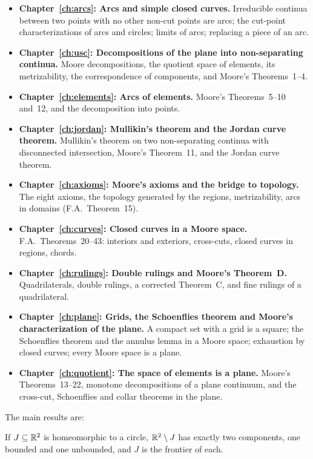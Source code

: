 \begin{itemize}
\item \textbf{Chapter~\ref{ch:arcs}: Arcs and simple closed curves.} Irreducible continua between two
points with no other non-cut points are arcs; the cut-point characterizations of arcs and circles;
limits of arcs; replacing a piece of an arc.
\item \textbf{Chapter~\ref{ch:usc}: Decompositions of the plane into non-separating continua.} Moore
decompositions, the quotient space of elements, its metrizability, the correspondence of components,
and Moore's Theorems~1--4.
\item \textbf{Chapter~\ref{ch:elements}: Arcs of elements.} Moore's Theorems~5--10 and~12, and the
decomposition into points.
\item \textbf{Chapter~\ref{ch:jordan}: Mullikin's theorem and the Jordan curve theorem.} Mullikin's
theorem on two non-separating continua with disconnected intersection, Moore's Theorem~11, and the
Jordan curve theorem.
\item \textbf{Chapter~\ref{ch:axioms}: Moore's axioms and the bridge to topology.} The eight axioms,
the topology generated by the regions, metrizability, arcs in domains (F.A.\ Theorem~15).
\item \textbf{Chapter~\ref{ch:curves}: Closed curves in a Moore space.} F.A.\ Theorems~20--43:
interiors and exteriors, cross-cuts, closed curves in regions, chords.
\item \textbf{Chapter~\ref{ch:rulings}: Double rulings and Moore's Theorem~D.} Quadrilaterals, double
rulings, a corrected Theorem~C, and fine rulings of a quadrilateral.
\item \textbf{Chapter~\ref{ch:plane}: Grids, the Schoenflies theorem and Moore's characterization of the
plane.} A compact set with a grid is a square; the Schoenflies theorem and the annulus lemma in a
Moore space; exhaustion by closed curves; every Moore space is a plane.
\item \textbf{Chapter~\ref{ch:quotient}: The space of elements is a plane.} Moore's Theorems~13--22,
monotone decompositions of a plane continuum, and the cross-cut, Schoenflies and collar theorems in
the plane.
\end{itemize}

The main results are:

\begin{theorem}
If $J\subseteq\mathbb{R}^2$ is homeomorphic to a circle, $\mathbb{R}^2\setminus J$ has exactly two components, one bounded
and one unbounded, and $J$ is the frontier of each.
\end{theorem}

